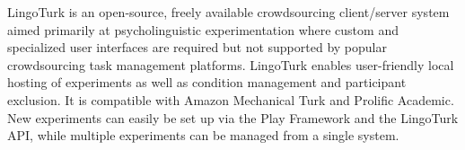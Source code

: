 LingoTurk is an open-source, freely available crowdsourcing client/server system aimed primarily at psycholinguistic experimentation where custom and specialized user interfaces are required but not supported by popular crowdsourcing task management platforms. LingoTurk enables user-friendly local hosting of experiments as well as condition management and participant exclusion. It is compatible with Amazon Mechanical Turk and Prolific Academic. New experiments can easily be set up via the Play Framework and the LingoTurk API, while multiple experiments can be managed from a single system.
